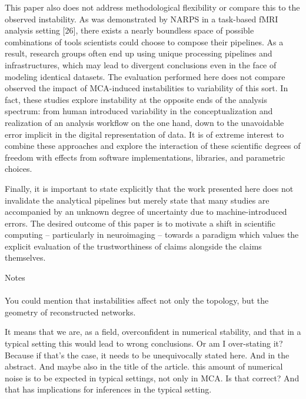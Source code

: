 \documentclass[fleqn,10pt]{SelfArx} %
\begin{document}
This paper also does not address methodological flexibility or compare this to the observed instability. As was demonstrated by NARPS in a task-based fMRI analysis setting [26], there exists a nearly boundless space of possible combinations of tools scientists could choose to compose their pipelines. As a result, research groups often end up using unique processing pipelines and infrastructures, which may lead to divergent conclusions even in the face of modeling identical datasets. The evaluation performed here does not compare observed the impact of MCA-induced instabilities to variability of this sort. In fact, these studies explore instability at the opposite ends of the analysis spectrum: from human introduced variability in the conceptualization and realization of an analysis workflow on the one hand, down to the unavoidable error implicit in the digital representation of data. It is of extreme interest to combine these approaches and explore the interaction of these scientific degrees of freedom with effects from software implementations, libraries, and parametric choices.

Finally, it is important to state explicitly that the work presented here does not invalidate the analytical pipelines but merely state that many studies are accompanied by an unknown degree of uncertainty due to machine-introduced errors. The desired outcome of this paper is to motivate a shift in scientific computing – particularly in neuroimaging – towards a paradigm which values the explicit evaluation of the trustworthiness of claims alongside the claims themselves.

{\color{orange}Notes\\\\
You could mention that instabilities affect not only the topology, but the geometry of reconstructed networks.

It means that we are, as a field, overconfident in numerical stability, and that in a typical setting this would lead
to wrong conclusions. Or am I over-stating it? Because if that's the case, it needs to be unequivocally stated here.
And in the abstract. And maybe also in the title of the article. this amount of numerical noise is to be expected in
typical settings, not only in MCA. Is that correct? And that has implications for inferences in the typical setting.
}


{\footnotesize }
\end{document}
